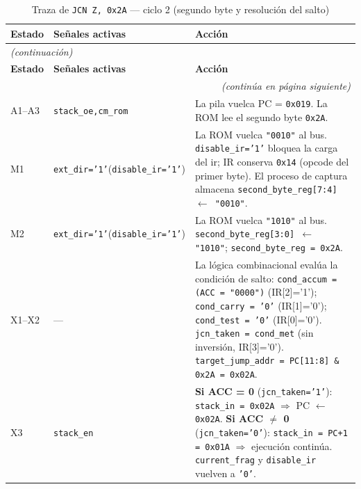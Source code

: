 \documentclass[%
    school=etsisi,%
    type=pfg,%
    degree=61CI,%
]{upm-report}
\begin{document}
\begin{longtable}{@{}p{1.2cm}p{4.2cm}p{\dimexpr\linewidth-5.4cm-4\tabcolsep\relax}@{}}
\caption{Traza de \texttt{JCN Z, 0x2A} --- ciclo 2 (segundo byte y resolución del salto)}
\label{tab:traza-jcn-c2}\\
\toprule
\textbf{Estado} & \textbf{Señales activas} & \textbf{Acción}\\
\midrule
\endfirsthead
\multicolumn{3}{l}{\small\itshape(continuación)}\\
\toprule
\textbf{Estado} & \textbf{Señales activas} & \textbf{Acción}\\
\midrule
\endhead
\midrule
\multicolumn{3}{r}{\small\itshape(continúa en página siguiente)}\\
\endfoot
\bottomrule
\endlastfoot
A1--A3 & \texttt{stack\_oe,}\newline\texttt{cm\_rom} &
    La pila vuelca PC = \texttt{0x019}.
    La ROM lee el segundo byte \texttt{0x2A}. \\
\addlinespace
M1 & \texttt{ext\_dir='1'}\newline(\texttt{disable\_ir='1'}) &
    La ROM vuelca \texttt{"0010"} al bus.
    \texttt{disable\_ir='1'} bloquea la carga del \acrshort{ir};
    IR conserva \texttt{0x14} (opcode del primer byte).
    El proceso de captura almacena
    \texttt{second\_byte\_reg[7:4] $\leftarrow$ "0010"}. \\
\addlinespace
M2 & \texttt{ext\_dir='1'}\newline(\texttt{disable\_ir='1'}) &
    La ROM vuelca \texttt{"1010"} al bus.
    \texttt{second\_byte\_reg[3:0] $\leftarrow$ "1010"};
    \texttt{second\_byte\_reg = 0x2A}. \\
\addlinespace
X1--X2 & --- &
    La lógica combinacional evalúa la condición de salto:
    \texttt{cond\_accum = (ACC = "0000")} (IR[2]='1');
    \texttt{cond\_carry = '0'} (IR[1]='0');
    \texttt{cond\_test = '0'} (IR[0]='0').
    \texttt{jcn\_taken = cond\_met} (sin inversión, IR[3]='0').
    \texttt{target\_jump\_addr = PC[11:8]\,\&\,0x2A = 0x02A}. \\
\addlinespace
X3 & \texttt{stack\_en} &
    \textbf{Si ACC = 0} (\texttt{jcn\_taken='1'}):
    \texttt{stack\_in = 0x02A} $\Rightarrow$ PC $\leftarrow$ \texttt{0x02A}.\newline
    \textbf{Si ACC $\neq$ 0} (\texttt{jcn\_taken='0'}):
    \texttt{stack\_in = PC+1 = 0x01A} $\Rightarrow$ ejecución continúa.\newline
    \texttt{current\_frag} y \texttt{disable\_ir} vuelven a \texttt{'0'}. \\
\end{longtable}
\end{document}
